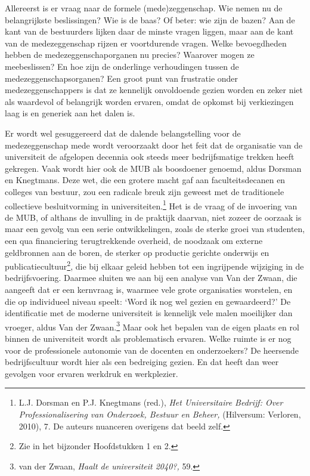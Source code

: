 \documentclass[smallauthor, chapterhaspagenum, nochapterinheader, pagenuminheader,  bigchapnum,medium2, tocpages,  garamond, titleinheader]{jote-book}
\begin{document}
	Allereerst is er vraag naar de formele (mede)zeggenschap. Wie nemen nu de belangrijkste beslissingen? Wie is de baas? Of beter: wie zijn de bazen? Aan de kant van de bestuurders lijken daar de minste vragen liggen, maar aan de kant van de medezeggenschap rijzen er voortdurende vragen. Welke bevoegdheden hebben de medezeggenschaporganen nu precies? Waarover mogen ze meebeslissen? En hoe zijn de onderlinge verhoudingen tussen de medezeggenschapsorganen? Een groot punt van frustratie onder medezeggenschappers is dat ze kennelijk onvoldoende gezien worden en zeker niet als waardevol of belangrijk worden ervaren, omdat de opkomst bij verkiezingen laag is en generiek aan het dalen is.



	Er wordt wel gesuggereerd dat de dalende belangstelling voor de medezeggenschap mede wordt veroorzaakt door het feit dat de organisatie van de universiteit de afgelopen decennia ook steeds meer bedrijfsmatige trekken heeft gekregen. Vaak wordt hier ook de MUB als boosdoener genoemd, aldus Dorsman en Knegtmans. Deze wet, die een grotere macht gaf aan faculteitsdecanen en colleges van bestuur, zou een radicale breuk zijn geweest met de traditionele collectieve besluitvorming in universiteiten.\footnote{L.J. Dorsman en P.J. Knegtmans (red.), \emph{Het Universitaire Bedrijf: Over Professionalisering van Onderzoek, Bestuur en Beheer,}\emph{ }(Hilversum: Verloren, 2010), 7. De auteurs nuanceren overigens dat beeld zelf.} Het is de vraag of de invoering van de MUB, of althans de invulling in de praktijk daarvan, niet zozeer de oorzaak is maar een gevolg van een serie ontwikkelingen, zoals de sterke groei van studenten, een qua financiering terugtrekkende overheid, de noodzaak om externe geldbronnen aan de boren, de sterker op productie gerichte onderwijs en publicatiecultuur\footnote{Zie in het bijzonder Hoofdstukken 1 en 2.}, die bij elkaar geleid hebben tot een ingrijpende wijziging in de bedrijfsvoering. Daarmee sluiten we aan bij een analyse van Van der Zwaan, die aangeeft dat er een kernvraag is, waarmee vele grote organisaties worstelen, en die op individueel niveau speelt: ‘Word ik nog wel gezien en gewaardeerd?' De identificatie met de moderne universiteit is kennelijk vele malen moeilijker dan vroeger, aldus Van der Zwaan.\footnote{van der Zwaan, \emph{Haalt de universiteit 2040?,} 59.} Maar ook het bepalen van de eigen plaats en rol binnen de universiteit wordt als problematisch ervaren. Welke ruimte is er nog voor de professionele autonomie van de docenten en onderzoekers? De heersende bedrijfscultuur wordt hier als een bedreiging gezien. En dat heeft dan weer gevolgen voor ervaren werkdruk en werkplezier.
\end{document}
